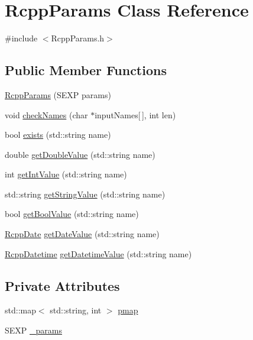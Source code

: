 \hypertarget{classRcppParams}{
\section{RcppParams Class Reference}
\label{classRcppParams}
}


{\ttfamily \#include $<$RcppParams.h$>$}\subsection*{Public Member Functions}
\begin{DoxyCompactItemize}
\item 
\hyperlink{classRcppParams_a7315d083ee0d1d0ca00c3aad0175d524}{RcppParams} (SEXP params)
\item 
void \hyperlink{classRcppParams_a1b8feaf39d3ffdf0f6773c44ac53736c}{checkNames} (char $\ast$inputNames\mbox{[}$\,$\mbox{]}, int len)
\item 
bool \hyperlink{classRcppParams_a989141ab2a8800b97d91bfb43420c6bc}{exists} (std::string name)
\item 
double \hyperlink{classRcppParams_aa45f8bc1cd8a64aa9a98e24158407077}{getDoubleValue} (std::string name)
\item 
int \hyperlink{classRcppParams_abb554151641ab12a793f28d3d081973a}{getIntValue} (std::string name)
\item 
std::string \hyperlink{classRcppParams_adc04f4552582eeec09b0806ddd8e2581}{getStringValue} (std::string name)
\item 
bool \hyperlink{classRcppParams_ad818a50a0e269360f3f74c5259dec882}{getBoolValue} (std::string name)
\item 
\hyperlink{classRcppDate}{RcppDate} \hyperlink{classRcppParams_aae20c7ee73aa2f1176837cc9387ad008}{getDateValue} (std::string name)
\item 
\hyperlink{classRcppDatetime}{RcppDatetime} \hyperlink{classRcppParams_aa4bec8bfe32d5079e64dc1c9a8fcf1b9}{getDatetimeValue} (std::string name)
\end{DoxyCompactItemize}
\subsection*{Private Attributes}
\begin{DoxyCompactItemize}
\item 
std::map$<$ std::string, int $>$ \hyperlink{classRcppParams_a399697fc90ba3136c61dd6e20931bd8b}{pmap}
\item 
SEXP \hyperlink{classRcppParams_a3040dda3b32eff66fb73d3ba3874ca5b}{\_\-params}
\end{DoxyCompactItemize}



